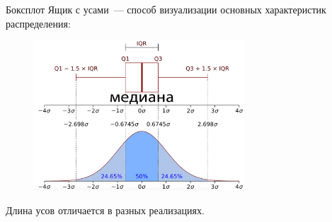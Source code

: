 \documentclass[9pt,pdf,utf8,hyperref={unicode},aspectratio=169]{beamer}
\begin{document}
\begin{frame}{Боксплот}
	Ящик с усами~--- способ визуализации основных характеристик распределения:
	\begin{figure}
		\includegraphics[width=0.7\textwidth]{boxplot.png}
	\end{figure} 
	Длина усов отличается в разных реализациях.
\end{frame}
\end{document}
